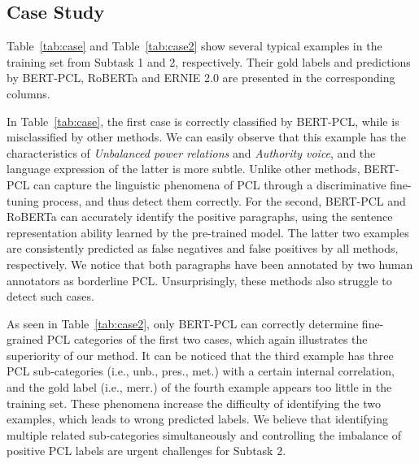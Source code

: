 \documentclass[11pt]{article}
\begin{document}
\subsection{Case Study}


Table~\ref{tab:case} and Table~\ref{tab:case2} show several typical examples in the training set from Subtask 1 and 2, respectively. Their gold labels and predictions by BERT-PCL, RoBERTa and ERNIE 2.0 are presented in the corresponding columns. 

In Table~\ref{tab:case},  the first case is correctly classified by BERT-PCL, while is misclassified by other methods. We can easily observe that this example has the characteristics of \textit{Unbalanced power relations} and \textit{Authority voice}, and the language expression of the latter is more subtle. Unlike other methods, BERT-PCL can capture  the linguistic phenomena of PCL through a discriminative fine-tuning process, and thus detect them correctly.
For the second, BERT-PCL and RoBERTa can accurately identify the positive paragraphs, using the sentence representation ability learned by the pre-trained model. The latter two examples are consistently predicted as false negatives and false positives by all methods, respectively. We notice that both paragraphs have been annotated by two human annotators as borderline PCL. Unsurprisingly, these methods also struggle to detect such cases. 


As seen in Table~\ref{tab:case2}, only BERT-PCL can correctly determine fine-grained PCL categories of the first two cases, which again illustrates the superiority of our method.
It can be noticed that the third example has three PCL sub-categories (i.e., unb., pres., met.) with a certain internal correlation, and the gold label (i.e., merr.) of the fourth example appears too little in the training set. These phenomena increase the difficulty of identifying the two examples, which leads to wrong predicted labels. We believe that identifying multiple related sub-categories simultaneously and controlling the imbalance of positive PCL labels are urgent challenges for Subtask 2.
\end{document}
